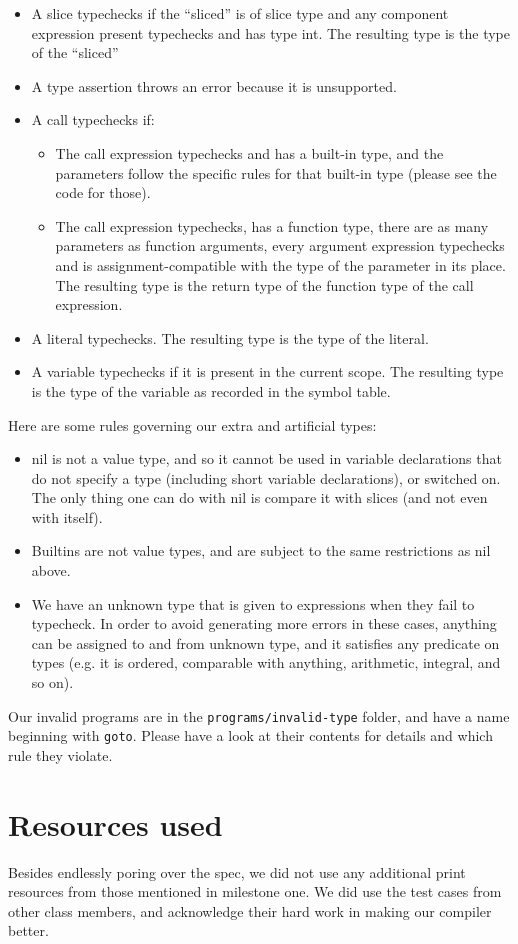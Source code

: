 \documentclass[letterpaper,11pt]{article}
\begin{document}
\begin{itemize}
\item A slice typechecks if the ``sliced'' is of slice type and any component expression present typechecks and has type int. The resulting type is the type of the ``sliced''
\item A type assertion throws an error because it is unsupported.
\item A call typechecks if:
	\begin{itemize}
	\item The call expression typechecks and has a built-in type, and the parameters follow the specific rules for that built-in type (please see the code for those).
	\item The call expression typechecks, has a function type, there are as many parameters as function arguments, every argument expression typechecks and is assignment-compatible with the type of the parameter in its place. The resulting type is the return type of the function type of the call expression.
	\end{itemize}
\item A literal typechecks. The resulting type is the type of the literal.
\item A variable typechecks if it is present in the current scope. The resulting type is the type of the variable as recorded in the symbol table.
\end{itemize}

Here are some rules governing our extra and artificial types:
\begin{itemize}
\item nil is not a value type, and so it cannot be used in variable declarations that do not specify a type (including short variable declarations), or switched on. The only thing one can do with nil is compare it with slices (and not even with itself).
\item Builtins are not value types, and are subject to the same restrictions as nil above.
\item We have an unknown type that is given to expressions when they fail to typecheck. In order to avoid generating more errors in these cases, anything can be assigned to and from unknown type, and it satisfies any predicate on types (e.g. it is ordered, comparable with anything, arithmetic, integral, and so on).
\end{itemize}

Our invalid programs are in the \texttt{programs/invalid-type} folder, and have a name beginning with \texttt{goto}. Please have a look at their contents for details and which rule they violate.

\section{Resources used}
Besides endlessly poring over the spec, we did not use any additional print resources from those mentioned in milestone one. We did use the test cases from other class members, and acknowledge their hard work in making our compiler better.
\end{document}
